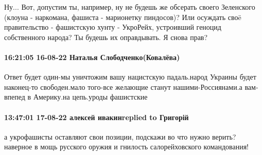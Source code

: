 Ну... Вот, допустим ты, например, ну не будешь же обсерать своего Зеленского (клоуна - наркомана, фашиста - марионетку пиндосов)?
Или осуждать своë правительство - фашистскую хунту - УкроРейх, устроивший геноцид собственного народа?
Ты будешь их оправдывать.
Я снова прав?

\paragraph{16:21:05 16-08-22 Наталья Слободченко(Ковалёва)}

Ответ будет один-мы уничтожим вашу нацистскую падаль.народ Украины будет
наконец-то свободен.мало того-все желающие станут нашими-Россиянами.а
вам-впепед в Америку.на цепь.уроды фашистские

\paragraph{13:47:01 17-08-22 алексей ивакинreplied to Григорій}

а укрофашисты оставляют свои позиции, подскажи во что нужно верить? наверное в
мощь русского оружия и гнилость салорейховского командования!
